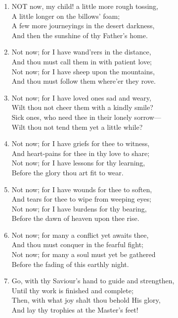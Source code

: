 \begin{enumerate}
    \item NOT now, my child! a little more rough tossing, \\
        A little longer on the billows' foam; \\
        A few more journeyings in the desert darkness, \\
        And then the sunshine of thy Father's home.

    \item Not now; for I have wand'rers in the distance, \\
        And thou must call them in with patient love; \\
        Not now; for I have sheep upon the mountains, \\
        And thou must follow them where'er they rove.

    \item Not now; for I have loved ones sad and weary, \\
        Wilt thou not cheer them with a kindly smile? \\
        Sick ones, who need thee in their lonely sorrow--- \\
        Wilt thou not tend them yet a little while?

    \item Not now; for I have griefs for thee to witness, \\
        And heart-pains for thee in thy love to share; \\
        Not now; for I have lessons for thy learning, \\
        Before the glory thou art fit to wear.

    \item Not now; for I have wounds for thee to soften, \\
        And tears for thee to wipe from weeping eyes; \\
        Not now; for I have burdens for thy bearing, \\
        Before the dawn of heaven upon thee rise.

    \item Not now; for many a conflict yet awaits thee, \\
        And thou must conquer in the fearful fight; \\
        Not now; for many a soul must yet be gathered \\
        Before the fading of this earthly night.

    \item Go, with thy Saviour's hand to guide and strengthen, \\
        Until thy work is finished and complete; \\
        Then, with what joy shalt thou behold His glory, \\
        And lay thy trophies at the Master's feet!

\end{enumerate}

